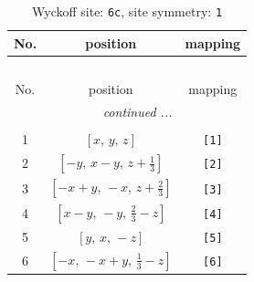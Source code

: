 \documentclass[fleqn,8pt]{jsarticle}
\begin{document}
\renewcommand{\arraystretch}{1.2}
\begin{longtable}{ccc}
\caption{Wyckoff site: {\tt 6c}, site symmetry: {\tt 1}}
 \\
 \hline \hline
No. & position & mapping \\ \hline \endfirsthead

\multicolumn{2}{l}{\tablename\ \thetable{}} \\
 \hline \hline
No. & position & mapping \\ \hline \endhead

 \hline \hline
\multicolumn{2}{r}{\footnotesize\it continued ...} \\ \endfoot

 \hline \hline
\multicolumn{2}{r}{} \\ \endlastfoot

1 & $\left[ x,\, y,\, z \right]$ & {\tt [1]} \\ \hline
2 & $\left[ - y,\, x - y,\, z + \frac{1}{3} \right]$ & {\tt [2]} \\ \hline
3 & $\left[ - x + y,\, - x,\, z + \frac{2}{3} \right]$ & {\tt [3]} \\ \hline
4 & $\left[ x - y,\, - y,\, \frac{2}{3} - z \right]$ & {\tt [4]} \\ \hline
5 & $\left[ y,\, x,\, - z \right]$ & {\tt [5]} \\ \hline
6 & $\left[ - x,\, - x + y,\, \frac{1}{3} - z \right]$ & {\tt [6]} \\
\end{longtable}
\end{document}
